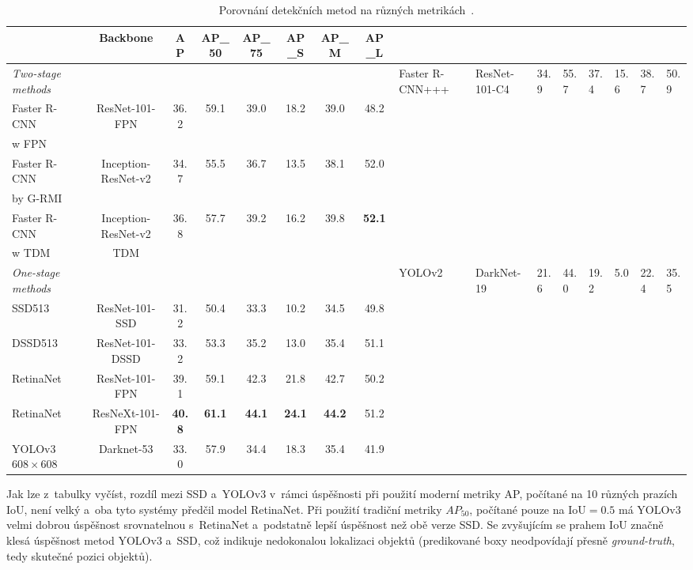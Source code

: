 \begin{table}[H]
	\vskip6pt
	\centering
    \begin{tabular}{ l | c | c c c | c c c }
        & Backbone & AP & AP_{50} & AP_{75} & AP_S & AP_M & AP_L \\
        \toprule
        \emph{Two-stage methods} & & & & & & & &
        Faster R-CNN+++ & ResNet-101-C4 & 34.9 & 55.7 & 37.4 & 15.6 & 38.7 & 50.9 \\
        Faster R-CNN & ResNet-101-FPN & 36.2 & 59.1 & 39.0 & 18.2 & 39.0 & 48.2 \\
        w FPN & & & & & & & \\
        Faster R-CNN & Inception-ResNet-v2 & 34.7 & 55.5 & 36.7 & 13.5 & 38.1 & 52.0 \\
        by G-RMI & & & & & & & \\
        Faster R-CNN & Inception-ResNet-v2 & 36.8 & 57.7 & 39.2 & 16.2 & 39.8 & \textbf{52.1} \\
        w TDM & TDM & & & & & & \\
        \hline
        \emph{One-stage methods} & & & & & & & &
        YOLOv2 & DarkNet-19 & 21.6 & 44.0 & 19.2 & 5.0 & 22.4 & 35.5 \\
        SSD513 & ResNet-101-SSD & 31.2 & 50.4 & 33.3 & 10.2 & 34.5 & 49.8 \\
        DSSD513 & ResNet-101-DSSD & 33.2 & 53.3 & 35.2 & 13.0 & 35.4 & 51.1 \\
        RetinaNet & ResNet-101-FPN & 39.1 & 59.1 & 42.3 & 21.8 & 42.7 & 50.2 \\
        RetinaNet & ResNeXt-101-FPN & \textbf{40.8} & \textbf{61.1} & \textbf{44.1} & \textbf{24.1} & \textbf{44.2} & 51.2 \\
        YOLOv3 $608 \times 608$ & Darknet-53 & 33.0 & 57.9 & 34.4 & 18.3 & 35.4 & 41.9 \\
    \end{tabular}
    \caption{Porovnání detekčních metod na různých metrikách~\cite{yolov3}.} 
    \vskip6pt
    \label{tab:porovnaniMetody}
\end{table}

Jak lze z~tabulky vyčíst, rozdíl mezi SSD a~YOLOv3 v~rámci úspěšnosti při použití moderní metriky AP, počítané na 10 různých prazích IoU, není velký a~oba tyto systémy předčil model RetinaNet. Při použití tradiční metriky $AP_{50}$, počítané pouze na $\text{IoU} = 0.5$ má YOLOv3 velmi dobrou úspěšnost srovnatelnou s~RetinaNet a~podstatně lepší úspěšnost než obě verze SSD. Se zvyšujícím se prahem IoU značně klesá úspěšnost metod YOLOv3 a~SSD, což indikuje nedokonalou lokalizaci objektů (predikované boxy neodpovídají přesně \emph{ground-truth}, tedy skutečné pozici objektů).

